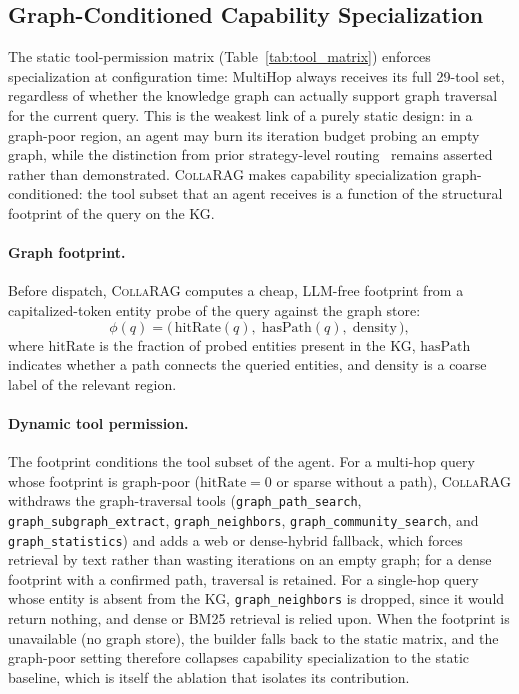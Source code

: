 \documentclass[11pt,a4paper]{article}
\newcommand{\sys}{\textsc{CollaRAG}}
\begin{document}
\subsection{Graph-Conditioned Capability Specialization}
\label{sec:capability}

The static tool-permission matrix (Table~\ref{tab:tool_matrix}) enforces specialization at configuration time: MultiHop always receives its full 29-tool set, regardless of whether the knowledge graph can actually support graph traversal for the current query.
This is the weakest link of a purely static design: in a graph-poor region, an agent may burn its iteration budget probing an empty graph, while the distinction from prior strategy-level routing~\citep{jeong2024adaptive} remains asserted rather than demonstrated.
\sys{} makes capability specialization graph-conditioned: the tool subset that an agent receives is a function of the structural footprint of the query on the KG.

\paragraph{Graph footprint.}
Before dispatch, \sys{} computes a cheap, LLM-free footprint from a capitalized-token entity probe of the query against the graph store:
\begin{equation}
\phi(q)=\bigl(\,\mathrm{hitRate}(q),\;\mathrm{hasPath}(q),\;\mathrm{density}\,\bigr),
\label{eq:footprint}
\end{equation}
where $\mathrm{hitRate}$ is the fraction of probed entities present in the KG, $\mathrm{hasPath}$ indicates whether a path connects the queried entities, and $\mathrm{density}$ is a coarse label of the relevant region.

\paragraph{Dynamic tool permission.}
The footprint conditions the tool subset of the agent.
For a multi-hop query whose footprint is graph-poor ($\mathrm{hitRate}{=}0$ or sparse without a path), \sys{} withdraws the graph-traversal tools (\texttt{graph\_path\_search}, \texttt{graph\_subgraph\_extract}, \texttt{graph\_neighbors}, \texttt{graph\_community\_search}, and \texttt{graph\_statistics}) and adds a web or dense-hybrid fallback, which forces retrieval by text rather than wasting iterations on an empty graph; for a dense footprint with a confirmed path, traversal is retained.
For a single-hop query whose entity is absent from the KG, \texttt{graph\_neighbors} is dropped, since it would return nothing, and dense or BM25 retrieval is relied upon.
When the footprint is unavailable (no graph store), the builder falls back to the static matrix, and the graph-poor setting therefore collapses capability specialization to the static baseline, which is itself the ablation that isolates its contribution.
\end{document}
